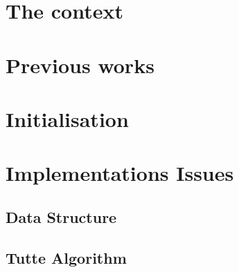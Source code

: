 \documentclass[12pt]{report}
\begin{document}


% 


\begin{abstract}

\end{abstract}

\tableofcontents
\listoffigures






\chapter{The context}

\chapter{Previous works}

%

\chapter{Initialisation}






\chapter{Implementations Issues}




\section{Data Structure}


\section{Tutte Algorithm}

\end{document}
